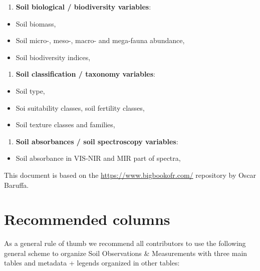 \documentclass[
  graybox,natbib,nospthms]{svmono}
\providecommand{\tightlist}{%
  \setlength{\itemsep}{0pt}\setlength{\parskip}{0pt}}
\providecommand{\tightlist}{\setlength{\itemsep}{0pt}\setlength{\parskip}{0pt}}
\begin{document}
\begin{enumerate}
\def\labelenumi{\arabic{enumi}.}
\setcounter{enumi}{2}
\tightlist
\item
  \textbf{Soil biological / biodiversity variables}:
\end{enumerate}

\begin{itemize}
\tightlist
\item
  Soil biomass,
\item
  Soil micro-, meso-, macro- and mega-fauna abundance,
\item
  Soil biodiversity indices,
\end{itemize}

\begin{enumerate}
\def\labelenumi{\arabic{enumi}.}
\setcounter{enumi}{3}
\tightlist
\item
  \textbf{Soil classification / taxonomy variables}:
\end{enumerate}

\begin{itemize}
\tightlist
\item
  Soil type,
\item
  Soi suitability classes, soil fertility classes,
\item
  Soil texture classes and families,
\end{itemize}

\begin{enumerate}
\def\labelenumi{\arabic{enumi}.}
\setcounter{enumi}{4}
\tightlist
\item
  \textbf{Soil absorbances / soil spectroscopy variables}:
\end{enumerate}

\begin{itemize}
\tightlist
\item
  Soil absorbance in VIS-NIR and MIR part of spectra,
\end{itemize}

This document is based on the \url{https://www.bigbookofr.com/} repository
by Oscar Baruffa.

\hypertarget{recommended-columns}{%
\section{Recommended columns}\label{recommended-columns}}

As a general rule of thumb we recommend all contributors to use the following
general scheme to organize Soil Observations \& Measurements with three main tables
and metadata + legends organized in other tables:
\end{document}
